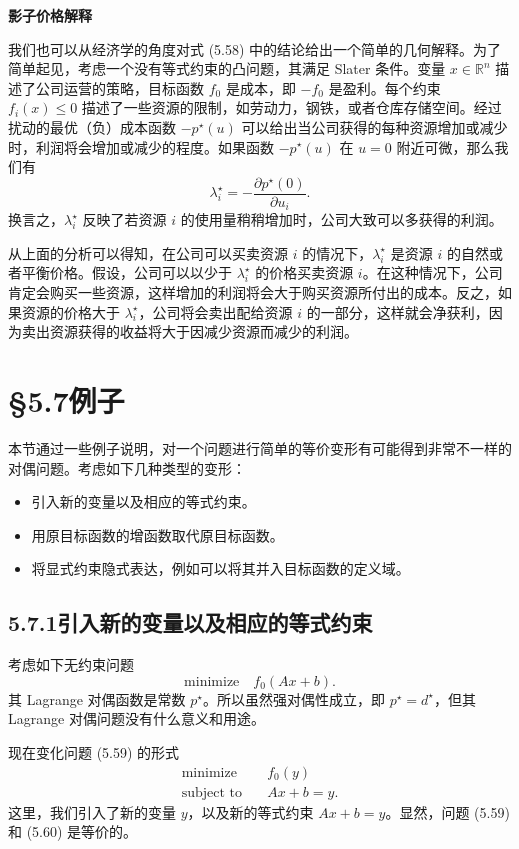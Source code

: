 \documentclass[UTF8,12pt,a4paper,fontset=fandol]{ctexart}
\begin{document}
\noindent\textbf{影子价格解释}

我们也可以从经济学的角度对式 (5.58) 中的结论给出一个简单的几何解释。为了简单起见，考虑一个没有等式约束的凸问题，其满足 Slater 条件。变量 $x\in\mathbb{R}^n$ 描述了公司运营的策略，目标函数 $f_0$ 是成本，即 $-f_0$ 是盈利。每个约束 $f_i(x)\leq 0$ 描述了一些资源的限制，如劳动力，钢铁，或者仓库存储空间。经过扰动的最优（负）成本函数 $-p^\star(u)$ 可以给出当公司获得的每种资源增加或减少时，利润将会增加或减少的程度。如果函数 $-p^\star(u)$ 在 $u=0$ 附近可微，那么我们有
\[
\lambda_i^\star=-\frac{\partial p^\star(0)}{\partial u_i}.
\]
换言之，$\lambda_i^\star$ 反映了若资源 $i$ 的使用量稍稍增加时，公司大致可以多获得的利润。

从上面的分析可以得知，在公司可以买卖资源 $i$ 的情况下，$\lambda_i^\star$ 是资源 $i$ 的自然或者平衡价格。假设，公司可以以少于 $\lambda_i^\star$ 的价格买卖资源 $i$。在这种情况下，公司肯定会购买一些资源，这样增加的利润将会大于购买资源所付出的成本。反之，如果资源的价格大于 $\lambda_i^\star$，公司将会卖出配给资源 $i$ 的一部分，这样就会净获利，因为卖出资源获得的收益将大于因减少资源而减少的利润。

\section*{§5.7\quad 例子}

本节通过一些例子说明，对一个问题进行简单的等价变形有可能得到非常不一样的对偶问题。考虑如下几种类型的变形：
\begin{itemize}
\item 引入新的变量以及相应的等式约束。
\item 用原目标函数的增函数取代原目标函数。
\item 将显式约束隐式表达，例如可以将其并入目标函数的定义域。
\end{itemize}

\subsection*{5.7.1\quad 引入新的变量以及相应的等式约束}

考虑如下无约束问题
\begin{equation}
\text{minimize}\quad f_0(Ax+b).
\tag{5.59}
\end{equation}
其 Lagrange 对偶函数是常数 $p^\star$。所以虽然强对偶性成立，即 $p^\star=d^\star$，但其 Lagrange 对偶问题没有什么意义和用途。

现在变化问题 (5.59) 的形式
\begin{equation}
\begin{aligned}
\text{minimize}\quad & f_0(y)\\
\text{subject to}\quad & Ax+b=y.
\end{aligned}
\tag{5.60}
\end{equation}
这里，我们引入了新的变量 $y$，以及新的等式约束 $Ax+b=y$。显然，问题 (5.59) 和 (5.60) 是等价的。
\end{document}
